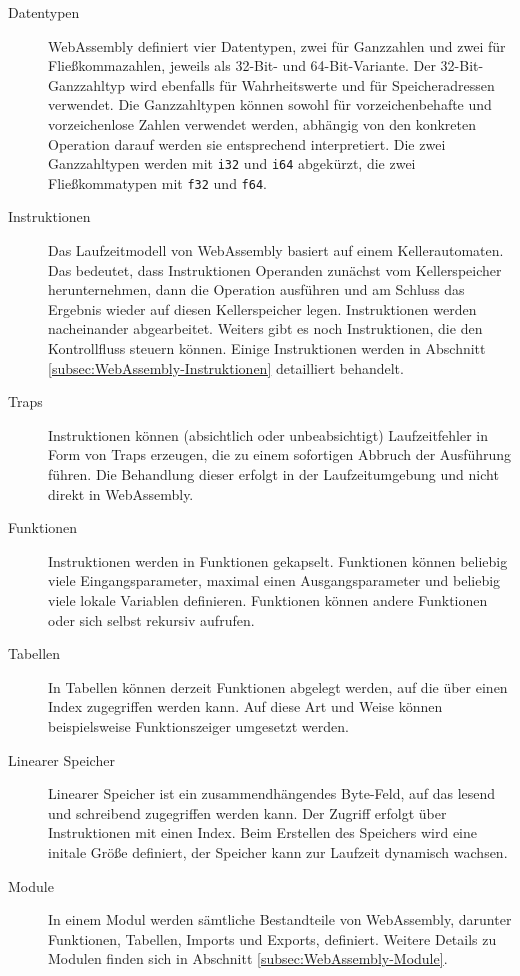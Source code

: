 \begin{description}
    \item[Datentypen] WebAssembly definiert vier Datentypen, zwei für Ganzzahlen und zwei für Fließkommazahlen, jeweils als 32-Bit- und 64-Bit-Variante. Der 32-Bit-Ganz\-zahl\-typ wird ebenfalls für Wahrheitswerte und für Speicheradressen verwendet. Die Ganzzahltypen können sowohl für vorzeichenbehafte und vorzeichenlose Zahlen verwendet werden, abhängig von den konkreten Operation darauf werden sie entsprechend interpretiert. Die zwei Ganzzahltypen werden mit \lstinline{i32} und \lstinline{i64} abgekürzt, die zwei Fließkommatypen mit \lstinline{f32} und \lstinline{f64}.
    \item[Instruktionen] Das Laufzeitmodell von WebAssembly basiert auf einem Kellerautomaten. Das bedeutet, dass Instruktionen Operanden zunächst vom Kellerspeicher herunternehmen, dann die Operation ausführen und am Schluss das Ergebnis wieder auf diesen Kellerspeicher legen. Instruktionen werden nacheinander abgearbeitet. Weiters gibt es noch Instruktionen, die den Kontrollfluss steuern können. Einige Instruktionen werden in Abschnitt \ref{subsec:WebAssembly-Instruktionen} detailliert behandelt.
    \item[Traps] Instruktionen können (absichtlich oder unbeabsichtigt) Laufzeitfehler in Form von Traps erzeugen, die zu einem sofortigen Abbruch der Ausführung führen. Die Behandlung dieser erfolgt in der Laufzeitumgebung und nicht direkt in WebAssembly.
    \item[Funktionen] Instruktionen werden in Funktionen gekapselt. Funktionen können beliebig viele Eingangsparameter, maximal einen Ausgangsparameter und beliebig viele lokale Variablen definieren. Funktionen können andere Funktionen oder sich selbst rekursiv aufrufen.
    \item[Tabellen] In Tabellen können derzeit Funktionen abgelegt werden, auf die über einen Index zugegriffen werden kann. Auf diese Art und Weise können beispielsweise Funktionszeiger umgesetzt werden. 
    \item[Linearer Speicher] Linearer Speicher ist ein zusammendhängendes Byte-Feld, auf das lesend und schreibend zugegriffen werden kann. Der Zugriff erfolgt über Instruktionen mit einen Index. Beim Erstellen des Speichers wird eine initale Größe definiert, der Speicher kann zur Laufzeit dynamisch wachsen.
    \item[Module] In einem Modul werden sämtliche Bestandteile von WebAssembly, darunter Funktionen, Tabellen, Imports und Exports, definiert. Weitere Details zu Modulen finden sich in Abschnitt \ref{subsec:WebAssembly-Module}.
\end{description}

